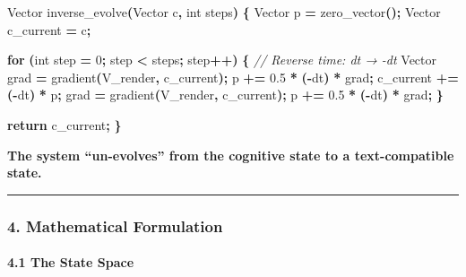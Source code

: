 \documentclass[
  11pt,
  a4paper,
]{article}
\newenvironment{Shaded}{\begin{snugshade}}{\end{snugshade}}
\newcommand{\CommentTok}[1]{\textcolor[rgb]{0.56,0.35,0.01}{\textit{#1}}}
\newcommand{\ControlFlowTok}[1]{\textcolor[rgb]{0.13,0.29,0.53}{\textbf{#1}}}
\newcommand{\DataTypeTok}[1]{\textcolor[rgb]{0.13,0.29,0.53}{#1}}
\newcommand{\DecValTok}[1]{\textcolor[rgb]{0.00,0.00,0.81}{#1}}
\newcommand{\FloatTok}[1]{\textcolor[rgb]{0.00,0.00,0.81}{#1}}
\newcommand{\NormalTok}[1]{#1}
\newcommand{\OperatorTok}[1]{\textcolor[rgb]{0.81,0.36,0.00}{\textbf{#1}}}
\begin{document}
\begin{Shaded}
\begin{Highlighting}[]
\NormalTok{Vector inverse\_evolve}\OperatorTok{(}\NormalTok{Vector c}\OperatorTok{,} \DataTypeTok{int}\NormalTok{ steps}\OperatorTok{)} \OperatorTok{\{}
\NormalTok{    Vector p }\OperatorTok{=}\NormalTok{ zero\_vector}\OperatorTok{();}
\NormalTok{    Vector c\_current }\OperatorTok{=}\NormalTok{ c}\OperatorTok{;}
    
    \ControlFlowTok{for} \OperatorTok{(}\DataTypeTok{int}\NormalTok{ step }\OperatorTok{=} \DecValTok{0}\OperatorTok{;}\NormalTok{ step }\OperatorTok{\textless{}}\NormalTok{ steps}\OperatorTok{;}\NormalTok{ step}\OperatorTok{++)} \OperatorTok{\{}
        \CommentTok{// Reverse time: dt → {-}dt}
\NormalTok{        Vector grad }\OperatorTok{=}\NormalTok{ gradient}\OperatorTok{(}\NormalTok{V\_render}\OperatorTok{,}\NormalTok{ c\_current}\OperatorTok{);}
\NormalTok{        p }\OperatorTok{+=} \FloatTok{0.5} \OperatorTok{*} \OperatorTok{({-}}\NormalTok{dt}\OperatorTok{)} \OperatorTok{*}\NormalTok{ grad}\OperatorTok{;}
\NormalTok{        c\_current }\OperatorTok{+=} \OperatorTok{({-}}\NormalTok{dt}\OperatorTok{)} \OperatorTok{*}\NormalTok{ p}\OperatorTok{;}
\NormalTok{        grad }\OperatorTok{=}\NormalTok{ gradient}\OperatorTok{(}\NormalTok{V\_render}\OperatorTok{,}\NormalTok{ c\_current}\OperatorTok{);}
\NormalTok{        p }\OperatorTok{+=} \FloatTok{0.5} \OperatorTok{*} \OperatorTok{({-}}\NormalTok{dt}\OperatorTok{)} \OperatorTok{*}\NormalTok{ grad}\OperatorTok{;}
    \OperatorTok{\}}
    
    \ControlFlowTok{return}\NormalTok{ c\_current}\OperatorTok{;}
\OperatorTok{\}}
\end{Highlighting}
\end{Shaded}

\textbf{The system ``un-evolves'' from the cognitive state to a
text-compatible state.}

\begin{center}\rule{0.5\linewidth}{0.5pt}\end{center}

\subsubsection{4. Mathematical
Formulation}\label{mathematical-formulation-3}

\paragraph{4.1 The State Space}\label{the-state-space}
\end{document}
